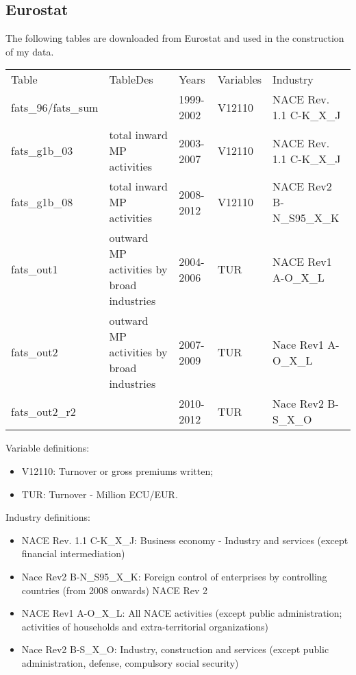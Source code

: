\documentclass[notitlepage,11pt]{article}%
\begin{document}
\subsection{Eurostat}

The following tables are downloaded from Eurostat and used in the construction
of my data.%

\begin{tabular}
[c]{lllll}%
Table & TableDes & Years & Variables & Industry\\
fats\_96/fats\_sum &  & 1999-2002 & V12110 & NACE Rev. 1.1 C-K\_X\_J\\
fats\_g1b\_03 & total inward MP activities & 2003-2007 & V12110 & NACE Rev.
1.1 C-K\_X\_J\\
fats\_g1b\_08 & total inward MP activities & 2008-2012 & V12110 & NACE Rev2
B-N\_S95\_X\_K\\
fats\_out1 & outward MP activities by broad industries & 2004-2006 & TUR &
NACE Rev1 A-O\_X\_L\\
fats\_out2 & outward MP activities by broad industries & 2007-2009 & TUR &
Nace Rev1 A-O\_X\_L\\
fats\_out2\_r2 &  & 2010-2012 & TUR & Nace Rev2 B-S\_X\_O
\end{tabular}


Variable definitions: 

\begin{itemize}
\item V12110: Turnover or gross premiums written; 

\item TUR: Turnover - Million ECU/EUR.
\end{itemize}

Industry definitions:

\begin{itemize}
\item NACE Rev. 1.1 C-K\_X\_J: Business economy - Industry and services
(except financial intermediation)

\item Nace Rev2 B-N\_S95\_X\_K: Foreign control of enterprises by controlling
countries (from 2008 onwards) NACE Rev 2

\item NACE Rev1 A-O\_X\_L: All NACE activities (except public administration;
activities of households and extra-territorial organizations)

\item Nace Rev2 B-S\_X\_O: Industry, construction and services (except public
administration, defense, compulsory social security)
\end{itemize}
\end{document}
